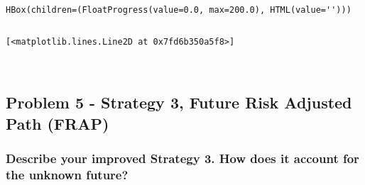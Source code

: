 \documentclass[11pt]{article}
\makeatletter
\newcommand{\boxspacing}{\kern\kvtcb@left@rule\kern\kvtcb@boxsep}
\newcommand{\prompt}[4]{
        {\ttfamily\llap{{\color{#2}[#3]:\hspace{3pt}#4}}\vspace{-\baselineskip}}
    }
\makeatother
\begin{document}
    
    \begin{Verbatim}[commandchars=\\\{\}]
HBox(children=(FloatProgress(value=0.0, max=200.0), HTML(value='')))
    \end{Verbatim}

    
    \begin{Verbatim}[commandchars=\\\{\}]

    \end{Verbatim}

            \begin{tcolorbox}[breakable, size=fbox, boxrule=.5pt, pad at break*=1mm, opacityfill=0]
\prompt{Out}{outcolor}{ }{\boxspacing}
\begin{Verbatim}[commandchars=\\\{\}]
[<matplotlib.lines.Line2D at 0x7fd6b350a5f8>]
\end{Verbatim}
\end{tcolorbox}
        
    \begin{center}
    \end{center}
    { \hspace*{\fill} \\}
    
    \hypertarget{problem-5---strategy-3-future-risk-adjusted-path-frap}{%
\subsection{Problem 5 - Strategy 3, Future Risk Adjusted Path
(FRAP)}\label{problem-5---strategy-3-future-risk-adjusted-path-frap}}

    \hypertarget{describe-your-improved-strategy-3.-how-does-it-account-for-the-unknown-future}{%
\subsubsection{Describe your improved Strategy 3. How does it account
for the unknown
future?}\label{describe-your-improved-strategy-3.-how-does-it-account-for-the-unknown-future}}
\end{document}

